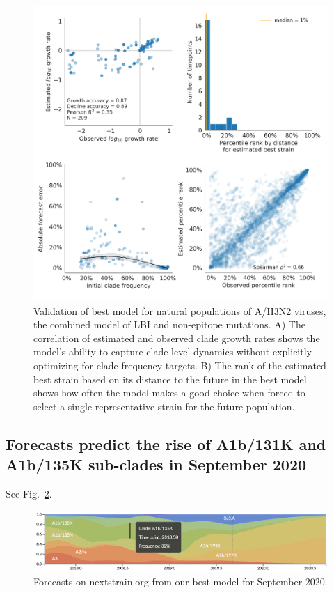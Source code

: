 \begin{figure}[ht]
  \begin{center}
  \includegraphics[width=\textwidth]{figures/validation-of-best-model-for-natural-populations.png}
  \caption{
  Validation of best model for natural populations of A/H3N2 viruses, the combined model of LBI and non-epitope mutations.
  A) The correlation of estimated and observed clade growth rates shows the model's ability to capture clade-level dynamics without explicitly optimizing for clade frequency targets.
  B) The rank of the estimated best strain based on its distance to the future in the best model shows how often the model makes a good choice when forced to select a single representative strain for the future population.
  }
  \label{fig:validation_of_best_model_for_natural_populations}
  \end{center}
\end{figure}

\subsection*{Forecasts predict the rise of A1b/131K and A1b/135K sub-clades in September 2020}

See Fig.~\ref{fig:nextstrain_forecasts}.

\begin{figure}[t]
  \begin{center}
  \includegraphics[width=\textwidth]{figures/nextstrain-forecasts-for-september-2020.png}
  \caption{Forecasts on nextstrain.org from our best model for September 2020.}
  \label{fig:nextstrain_forecasts}
  \end{center}
\end{figure}

